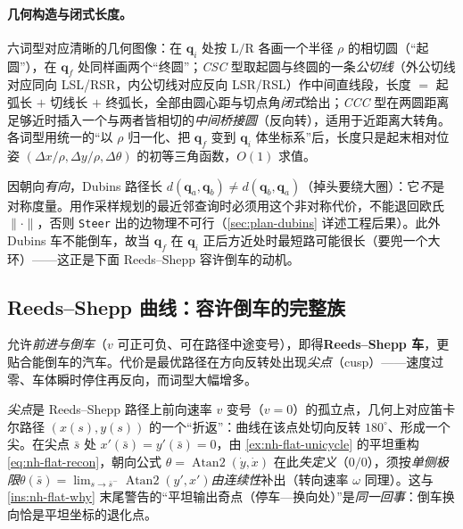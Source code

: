 \paragraph{几何构造与闭式长度。}
六词型对应清晰的几何图像：在 $\mathbf{q}_i$ 处按 $\mathrm{L}/\mathrm{R}$ 各画一个半径 $\rho$ 的相切圆（“起圆”），在 $\mathbf{q}_f$ 处同样画两个“终圆”；\emph{CSC} 型取起圆与终圆的一条\emph{公切线}（外公切线对应同向 LSL/RSR，内公切线对应反向 LSR/RSL）作中间直线段，长度 $=$ 起弧长 $+$ 切线长 $+$ 终弧长，全部由圆心距与切点角\emph{闭式}给出；\emph{CCC} 型在两圆距离足够近时插入一个与两者皆相切的\emph{中间桥接圆}（反向转），适用于近距离大转角。各词型用统一的“以 $\rho$ 归一化、把 $\mathbf{q}_f$ 变到 $\mathbf{q}_i$ 体坐标系”后，长度只是起末相对位姿 $(\Delta x/\rho,\Delta y/\rho,\Delta\theta)$ 的初等三角函数，$O(1)$ 求值。

\begin{pitfall}\label{pit:nh-dubins-metric}
因朝向\emph{有向}，Dubins 路径长 $d(\mathbf{q}_a,\mathbf{q}_b)\neq d(\mathbf{q}_b,\mathbf{q}_a)$（掉头要绕大圈）：它\emph{不}是对称度量。用作采样规划的最近邻查询时必须用这个非对称代价，不能退回欧氏 $\lVert\cdot\rVert$，否则 \texttt{Steer} 出的边物理不可行（\cref{sec:plan-dubins} 详述工程后果）。此外 Dubins 车不能倒车，故当 $\mathbf{q}_f$ 在 $\mathbf{q}_i$ 正后方近处时最短路可能很长（要兜一个大环）——这正是下面 Reeds--Shepp 容许倒车的动机。
\end{pitfall}

\subsection{Reeds--Shepp 曲线：容许倒车的完整族}
\label{sec:nh-reeds-shepp}

允许\emph{前进与倒车}（$v$ 可正可负、可在路径中途变号），即得\textbf{Reeds--Shepp 车}\cite{reeds1990optimal}，更贴合能倒车的汽车。代价是最优路径在方向反转处出现\emph{尖点}（cusp）——速度过零、车体瞬时停住再反向，而词型大幅增多。

\begin{definition}\label{def:nh-cusp}
\emph{尖点}是 Reeds--Shepp 路径上前向速率 $v$ 变号（$v=0$）的孤立点，几何上对应笛卡尔路径 $(x(s),y(s))$ 的一个“折返”：曲线在该点处切向反转 $180^\circ$、形成一个尖。在尖点 $\bar s$ 处 $x'(\bar s)=y'(\bar s)=0$，由 \cref{ex:nh-flat-unicycle} 的平坦重构 \cref{eq:nh-flat-recon}，朝向公式 $\theta=\operatorname{Atan2}(\dot y,\dot x)$ 在此\emph{失定义}（$0/0$），须按\emph{单侧极限}$\theta(\bar s)=\lim_{s\to\bar s^-}\operatorname{Atan2}(y',x')$\emph{由连续性}补出（转向速率 $\omega$ 同理）。这与 \cref{ins:nh-flat-why} 末尾警告的“平坦输出奇点（停车—换向处）”是\emph{同一回事}：倒车换向恰是平坦坐标的退化点。
\end{definition}

